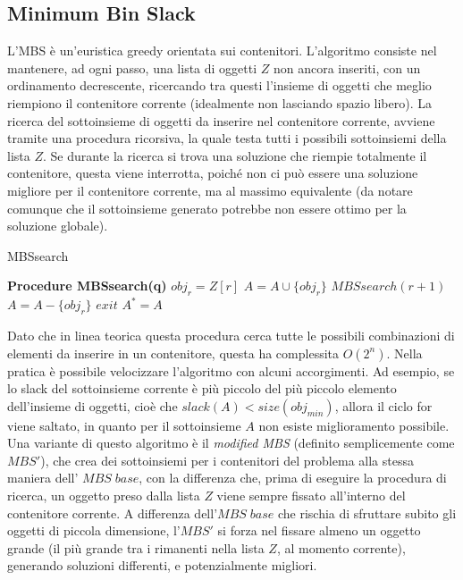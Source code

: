 \documentclass{article}
\begin{document}
\subsection{Minimum Bin Slack}
L'MBS è un'euristica greedy orientata sui contenitori. L'algoritmo consiste nel mantenere, ad ogni passo, una lista di oggetti $Z$ non ancora inseriti, con un ordinamento decrescente, ricercando tra questi l'insieme di oggetti che meglio riempiono il contenitore corrente (idealmente non lasciando spazio libero).
\newline
\newline
La ricerca del sottoinsieme di oggetti da inserire nel contenitore corrente, avviene tramite una procedura ricorsiva, la quale testa tutti i possibili sottoinsiemi della lista $Z$. Se durante la ricerca si trova una soluzione che riempie totalmente il contenitore, questa viene interrotta, poiché non ci può essere una soluzione migliore per il contenitore corrente, ma al massimo equivalente (da notare comunque che il sottoinsieme generato potrebbe non essere ottimo per la soluzione globale).
\newline
\begin{algorithm}[h]
\caption{MBSsearch}\label{MBSsearch}
\begin{algorithmic}[2]
\State \textbf{Procedure MBSsearch(q)}
\State $obj_{r} = Z[r]$
\State $A = A \cup \{obj_{r}\}$
\State $MBSsearch(r+1)$
\State $A = A - \{obj_{r}\}$
\State $exit$
\EndIf
{}
\EndIf 
{}
\EndFor
{}
\State $A^* = A$
\EndIf
{}
\end{algorithmic}
\end{algorithm}
\newpage
Dato che in linea teorica questa procedura cerca tutte le possibili combinazioni di elementi da inserire in un contenitore, questa ha complessita $O(2^n)$. Nella pratica è possibile velocizzare l'algoritmo con alcuni accorgimenti. Ad esempio, se lo slack del sottoinsieme corrente è più piccolo del più piccolo elemento dell'insieme di oggetti, cioè che $slack(A) < size(obj_{min})$, allora il ciclo for viene saltato, in quanto per il sottoinsieme $A$ non esiste miglioramento possibile.
\newline
\newline
Una variante di questo algoritmo è il \textit{modified MBS} (definito semplicemente come $MBS'$), che crea dei sottoinsiemi per i contenitori del problema alla stessa maniera dell' $MBS\;base$, con la differenza che, prima di eseguire la procedura di ricerca, un oggetto preso dalla lista $Z$ viene sempre fissato all'interno del contenitore corrente.
\newline
\newline
A differenza dell'$MBS\;base$ che rischia di sfruttare subito gli oggetti di piccola dimensione, l'$MBS'$ si forza nel fissare almeno un oggetto grande (il più grande tra i rimanenti nella lista $Z$, al momento corrente), generando soluzioni differenti, e potenzialmente migliori.
 
\end{document}
